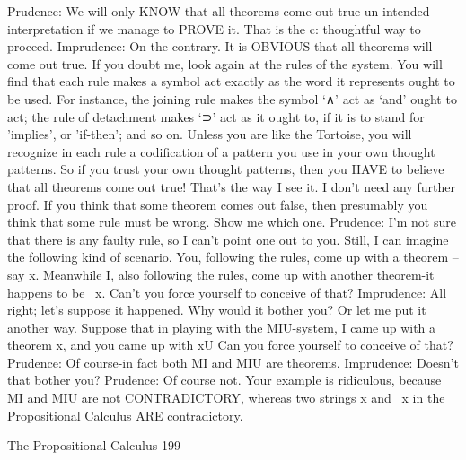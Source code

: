 Prudence: We will only KNOW that all theorems come out true un intended
   interpretation if we manage to PROVE it. That is the c: thoughtful way to proceed.
Imprudence: On the contrary. It is OBVIOUS that all theorems will come out true. If you
   doubt me, look again at the rules of the system. You will find that each rule makes a
   symbol act exactly as the word it represents ought to be used. For instance, the joining
   rule makes the symbol ‘∧’ act as `and' ought to act; the rule of detachment makes `⊃'
   act as it ought to, if it is to stand for 'implies', or 'if-then'; and so on. Unless you are
   like the Tortoise, you will recognize in each rule a codification of a pattern you use in
   your own thought patterns. So if you trust your own thought patterns, then you HAVE
   to believe that all theorems come out true! That's the way I see it. I don't need any
   further proof. If you think that some theorem comes out false, then presumably you
   think that some rule must be wrong. Show me which one.
Prudence: I'm not sure that there is any faulty rule, so I can't point one out to you. Still, I
   can imagine the following kind of scenario. You, following the rules, come up with a
   theorem -- say x. Meanwhile I, also following the rules, come up with another
   theorem-it happens to be ~x.           Can't you force yourself to conceive of that?
Imprudence: All right; let's suppose it happened. Why would it bother you? Or let me put
   it another way. Suppose that in playing with the MIU-system, I came up with a
   theorem x, and you came up with xU Can you force yourself to conceive of that?
Prudence: Of course-in fact both MI and MIU are theorems.
Imprudence: Doesn't that bother you?
Prudence: Of course not. Your example is ridiculous, because MI and MIU are not
   CONTRADICTORY, whereas two strings x and ~x in the Propositional Calculus
   ARE contradictory.




The Propositional Calculus                                                                 199

